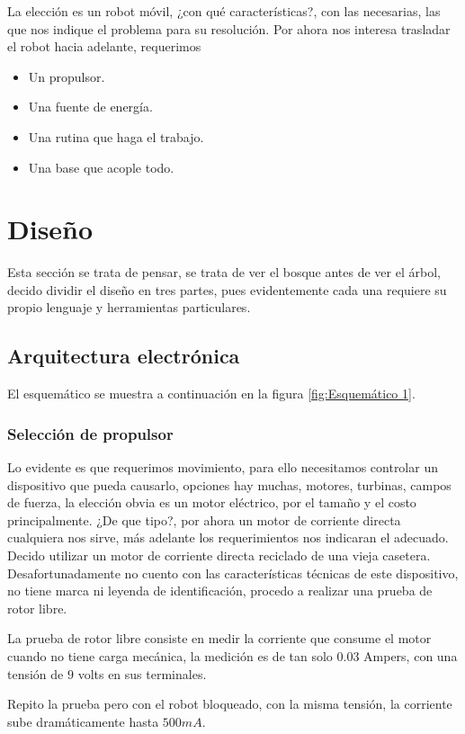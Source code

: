 La elección es un robot móvil, ¿con qué características?, con las necesarias, 
las que nos indique el problema para su resolución. Por ahora nos interesa
trasladar el robot hacia adelante, requerimos
\begin{itemize}
	\item Un propulsor.
	\item Una fuente de energía.
	\item Una rutina que haga el trabajo.
	\item Una base que acople todo.
\end{itemize}

\section{Diseño}
Esta sección se trata de pensar, se trata de ver el bosque antes de ver el árbol,
decido dividir el diseño en tres partes, pues evidentemente cada una requiere su 
propio lenguaje y herramientas particulares.
\subsection{Arquitectura electrónica}
El esquemático se muestra a continuación en la figura \ref{fig:Esquemático 1}.


\subsubsection{Selección de propulsor} 
Lo evidente es que requerimos movimiento, para ello necesitamos
controlar un dispositivo que pueda causarlo,
opciones hay muchas, motores, turbinas, campos de fuerza, la
elección obvia es un motor eléctrico, por el tamaño y el costo principalmente.
¿De que tipo?, por ahora un motor de corriente directa cualquiera nos sirve,
más adelante los requerimientos nos indicaran el adecuado. Decido utilizar
un motor de corriente directa reciclado de una vieja casetera.
Desafortunadamente no cuento con
las características técnicas de este dispositivo,  no tiene marca ni 
leyenda de identificación, procedo a realizar una prueba de rotor libre.

La prueba de rotor libre consiste en medir la corriente que consume el motor 
cuando no tiene carga mecánica, la medición es de tan solo $0.03$ Ampers, con 
una tensión de $9$ volts en sus terminales.

Repito la prueba pero con el robot bloqueado, con la misma tensión, la corriente
sube dramáticamente hasta $500 mA$.


